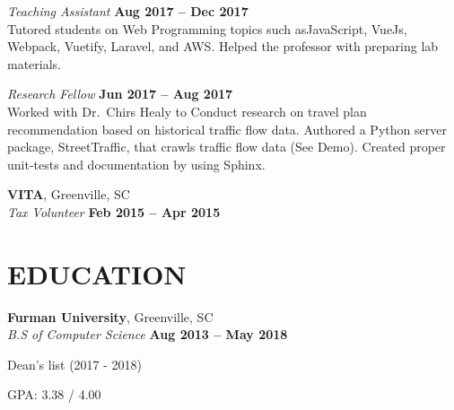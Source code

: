 \documentclass[margin,line]{resume}
\begin{document}
\begin{resume}
    \textsl{Teaching Assistant} \vspace{2mm}\hfill \textbf{Aug 2017 -- Dec 2017}\\
    Tutored students on Web Programming topics such asJavaScript, VueJs, Webpack, Vuetify, Laravel, and
    AWS. Helped the professor with preparing lab materials. \vspace{1mm}
    
    \textsl{Research Fellow} \vspace{2mm}\hfill \textbf{Jun 2017 -- Aug 2017}\\
    Worked with Dr.~Chirs Healy to Conduct research on travel plan recommendation based on historical traffic flow data. Authored a Python server package, StreetTraffic, that crawls traffic flow data (See Demo). Created proper unit-tests and documentation by using Sphinx.



    \textbf{\listing VITA}, Greenville, SC \vspace{2mm}\\\vspace{1mm}%
    \textsl{Tax Volunteer} \hfill \textbf{Feb 2015 -- Apr 2015}

\sectionline

    \section{\mysidestyle \textbf{\large{E}\small{DUCATION}}}

    \textbf{\listing Furman University}, Greenville, SC \vspace{2mm}\\\vspace{1mm}%
    \textsl{B.S of Computer Science} \hfill \textbf{ Aug 2013 -- May 2018}\vspace{-3mm}\\\vspace{-1mm}%
    \begin{list2}
        \item Dean's list (2017 - 2018)
        \item GPA: 3.38 / 4.00
    \end{list2}\vspace{-1.5mm}




\sectionline


\end{resume}
\end{document}
